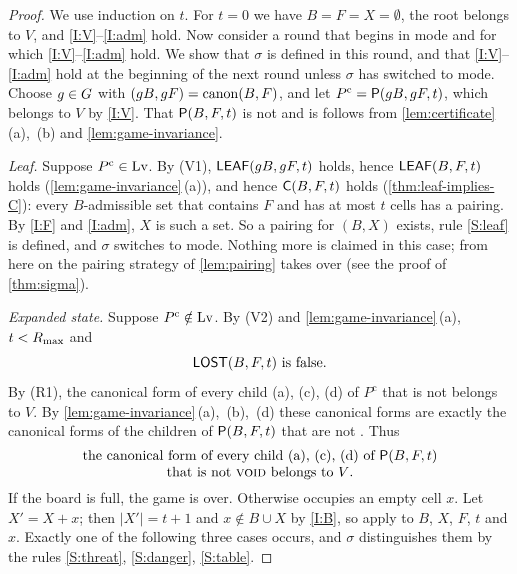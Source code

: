 \begin{proof}
We use induction on $t$. For $t=0$ we have $B=F=X=\emptyset$, the root belongs to $V$, and
\ref{I:V}--\ref{I:adm} hold. Now consider a round that begins in \TABLE{} mode and for which
\ref{I:V}--\ref{I:adm} hold. We show that $\sigma$ is defined in this round, and that
\ref{I:V}--\ref{I:adm} hold at the beginning of the next round unless $\sigma$ has switched to \PAIRING{} mode.
Choose $g\in G$ with $(gB,gF)=\operatorname{canon}(B,F)$, and let $P^{\mathrm c}=\mathsf{P}(gB,gF,t)$, which belongs to $V$
by \ref{I:V}. That $\mathsf{P}(B,F,t)$ is not \VOID{} and is \WON{} follows from
\cref{lem:certificate}\,(a),~(b) and \cref{lem:game-invariance}.

\smallskip\noindent\emph{Leaf.} Suppose $P^{\mathrm c}\in\mathrm{Lv}$. By (V1), $\mathsf{LEAF}(gB,gF,t)$ holds, hence
$\mathsf{LEAF}(B,F,t)$ holds (\cref{lem:game-invariance}\,(a)), and hence $\mathsf{C}(B,F,t)$ holds
(\cref{thm:leaf-implies-C}): every $B$-admissible set that contains $F$ and has at most $t$ cells has
a pairing. By \ref{I:F} and \ref{I:adm}, $X$ is such a set. So a pairing for $(B,X)$ exists, rule
\ref{S:leaf} is defined, and $\sigma$ switches to \PAIRING{} mode. Nothing more is claimed in this case; from
here on the pairing strategy of \cref{lem:pairing} takes over (see the proof of
\cref{thm:sigma}).

\smallskip\noindent\emph{Expanded state.} Suppose $P^{\mathrm c}\notin\mathrm{Lv}$. By (V2) and
\cref{lem:game-invariance}\,(a), $t<R_{\max}$ and
\begin{equation}\label{eq:notlost}
  \mathsf{LOST}(B,F,t)\ \text{is false.}
\end{equation}
By (R1), the canonical form of every child \textup{(a)}, \textup{(c)}, \textup{(d)} of $P^{\mathrm c}$ that is
not \VOID{} belongs to $V$. By \cref{lem:game-invariance}\,(a),~(b),~(d) these canonical forms are exactly the
canonical forms of the children of $\mathsf{P}(B,F,t)$ that are not \VOID. Thus
\begin{equation}\label{eq:children}
  \begin{minipage}{0.84\textwidth}\centering
  the canonical form of every child \textup{(a)}, \textup{(c)}, \textup{(d)} of $\Pst(B,F,t)$\\
  that is not \VOID{} belongs to $V$.
  \end{minipage}
\end{equation}
If the board is full, the game is over. Otherwise \Maker{} occupies an empty cell $x$. Let $X'=X+x$; then $|X'|=t+1$ and $x\notin B\cup X$ by \ref{I:B}, so
 apply to $B$, $X$, $F$, $t$ and $x$. Exactly one of the following
three cases occurs, and $\sigma$ distinguishes them by the rules \ref{S:threat}, \ref{S:danger},
\ref{S:table}.


\end{proof}
